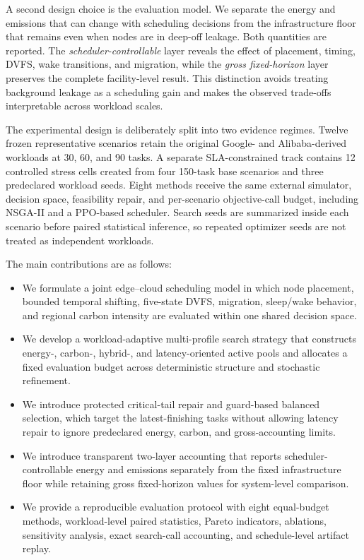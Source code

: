 \documentclass[preprint,12pt]{elsarticle}
\begin{document}
A second design choice is the evaluation model. We separate the energy and emissions that can change with scheduling decisions from the infrastructure floor that remains even when nodes are in deep-off leakage. Both quantities are reported. The \emph{scheduler-controllable} layer reveals the effect of placement, timing, DVFS, wake transitions, and migration, while the \emph{gross fixed-horizon} layer preserves the complete facility-level result. This distinction avoids treating background leakage as a scheduling gain and makes the observed trade-offs interpretable across workload scales.

The experimental design is deliberately split into two evidence regimes. Twelve frozen representative scenarios retain the original Google- and Alibaba-derived workloads at 30, 60, and 90 tasks. A separate SLA-constrained track contains 12 controlled stress cells created from four 150-task base scenarios and three predeclared workload seeds. Eight methods receive the same external simulator, decision space, feasibility repair, and per-scenario objective-call budget, including NSGA-II and a PPO-based scheduler. Search seeds are summarized inside each scenario before paired statistical inference, so repeated optimizer seeds are not treated as independent workloads.

The main contributions are as follows:
\begin{itemize}
    \item We formulate a joint edge--cloud scheduling model in which node placement, bounded temporal shifting, five-state DVFS, migration, sleep/wake behavior, and regional carbon intensity are evaluated within one shared decision space.
    \item We develop a workload-adaptive multi-profile search strategy that constructs energy-, carbon-, hybrid-, and latency-oriented active pools and allocates a fixed evaluation budget across deterministic structure and stochastic refinement.
    \item We introduce protected critical-tail repair and guard-based balanced selection, which target the latest-finishing tasks without allowing latency repair to ignore predeclared energy, carbon, and gross-accounting limits.
    \item We introduce transparent two-layer accounting that reports scheduler-controllable energy and emissions separately from the fixed infrastructure floor while retaining gross fixed-horizon values for system-level comparison.
    \item We provide a reproducible evaluation protocol with eight equal-budget methods, workload-level paired statistics, Pareto indicators, ablations, sensitivity analysis, exact search-call accounting, and schedule-level artifact replay.
\end{itemize}
\end{document}
